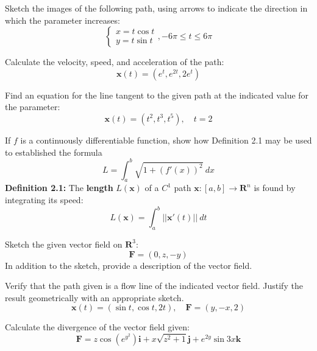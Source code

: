 \documentclass[12pt,letterpaper]{hmcpset}
\newcommand{\vb}{\mathbf}
\begin{document}

\begin{problem}[Colley 3.1.3]
  Sketch the images of the following path, using arrows to indicate the direction in which the parameter increases:
  \[\begin{cases}
      x = t\cos t \\
      y = t\sin t
    \end{cases}, -6\pi \leq t \leq 6\pi \]
\end{problem}
\clearpage

\begin{problem}[Colley 3.1.10]
  Calculate the velocity, speed, and acceleration of the path:
  \[ \vb x(t) = \left(e^t, e^{2t}, 2e^t \right) \]
\end{problem}
\clearpage

\begin{problem}[Colley 3.1.17]
  Find an equation for the line tangent to the given path at the indicated value for the parameter:
  \[ \vb x(t) = \left(t^2, t^3, t^5\right),\quad t=2 \]
\end{problem}
\clearpage

\begin{problem}[Colley 3.2.10]
  If $f$ is a continuously differentiable function, show how Definition 2.1 may be used to established the formula
  \[ L = \int_a^b\sqrt{1 + (f'(x))^2}~dx \]
  \textbf{Definition 2.1:} The \textbf{length} $L(\vb x)$ of a $C^1$ path $\vb x:[a, b]\to \vb R^n$ is found by integrating its speed: \[ L(\vb x) = \int_a^b ||\vb x'(t)||~dt \]
\end{problem}
\clearpage

\begin{problem}[Colley 3.3.9]
  Sketch the given vector field on $\vb R^3$:
  \[ \vb F = (0, z, -y) \]
  In addition to the sketch, provide a description of the vector field.
\end{problem}
\clearpage

\begin{problem}[Colley 3.3.18]
  Verify that the path given is a flow line of the indicated vector field.
  Justify the result geometrically with an appropriate sketch.
  \[ \vb x(t) = (\sin t, \cos t, 2t), \quad \vb F = (y, -x, 2) \]
\end{problem}
\clearpage

\begin{problem}[Colley 3.4.4]
  Calculate the divergence of the vector field given:
  \[ \vb F = z\cos\left(e^{y^2}\right)\vb i + x\sqrt{z^2 + 1}\vb j + e^{2y}\sin 3x\vb k \]
\end{problem}
\clearpage
\end{document}
